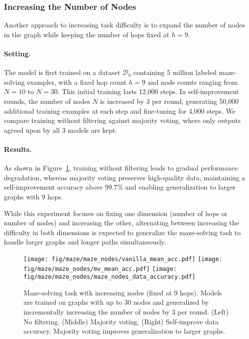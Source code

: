 \subsubsection{Increasing the Number of Nodes}
Another approach to increasing task difficulty is to expand the number of nodes in the graph while keeping the number of hops fixed at \( h=9 \).

\paragraph{Setting.}
The model is first trained on a dataset \( \mathcal{D}_0 \) containing 5 million labeled maze-solving examples, with a fixed hop count \( h=9 \) and node counts ranging from \( N=10 \) to \( N=30 \). This initial training lasts 12,000 steps. In self-improvement rounds, the number of nodes \( N \) is increased by 3 per round, generating 50,000 additional training examples at each step and fine-tuning for 4,000 steps. We compare training without filtering against majority voting, where only outputs agreed upon by all 3 models are kept.


\paragraph{Results.}
As shown in Figure~\ref{fig:maze_nodes_len_gen_result}, training without filtering leads to gradual performance degradation, whereas majority voting preserves high-quality data, maintaining a self-improvement accuracy above 99.7\% and enabling generalization to larger graphs with 9 hops.

While this experiment focuses on fixing one dimension (number of hops or number of nodes) and increasing the other, alternating between increasing the difficulty in both dimensions is expected to generalize the maze-solving task to handle larger graphs and longer paths simultaneously.

\begin{figure}
    \centering
    \texttt{[image: fig/maze/maze\_nodes/vanilla\_mean\_acc.pdf]}
    \hspace{1mm}
    \texttt{[image: fig/maze/maze\_nodes/mv\_mean\_acc.pdf]}
    \hspace{1mm}
    \texttt{[image: fig/maze/maze\_nodes/maze\_nodes\_data\_accuracy.pdf]}
    \caption{Maze-solving task with increasing nodes (fixed at 9 hops). Models are trained on graphs with up to 30 nodes and generalized by incrementally increasing the number of nodes by 3 per round. (Left) No filtering. (Middle) Majority voting. (Right) Self-improve data accuracy. Majority voting improves generalization to larger graphs.}
    \label{fig:maze_nodes_len_gen_result}
\end{figure}





